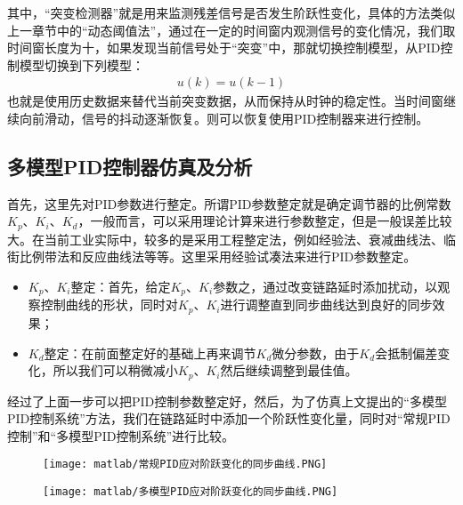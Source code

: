 其中，“突变检测器”就是用来监测残差信号是否发生阶跃性变化，具体的方法类似上一章节中的“动态阈值法”，通过在一定的时间窗内观测信号的变化情况，我们取时间窗长度为十，如果发现当前信号处于“突变”中，那就切换控制模型，从PID控制模型切换到下列模型：
\begin {align}
u(k) = u(k-1)
\end{align}
也就是使用历史数据来替代当前突变数据，从而保持从时钟的稳定性。当时间窗继续向前滑动，信号的抖动逐渐恢复。则可以恢复使用PID控制器来进行控制。

\subsection{多模型PID控制器仿真及分析}
首先，这里先对PID参数进行整定。所谓PID参数整定就是确定调节器的比例常数$K_{p}$、$K_{i}$、$K_{d}$，一般而言，可以采用理论计算来进行参数整定，但是一般误差比较大。在当前工业实际中，较多的是采用工程整定法，例如经验法、衰减曲线法、临街比例带法和反应曲线法等等。这里采用经验试凑法来进行PID参数整定。
\begin{itemize}[noitemsep,topsep=0pt,parsep=0pt,partopsep=0pt]
  \item $K_{p}$、$K_{i}$整定：首先，给定$K_{p}$、$K_{i}$参数之，通过改变链路延时添加扰动，以观察控制曲线的形状，同时对$K_{p}$、$K_{i}$进行调整直到同步曲线达到良好的同步效果；
  \item $K_{d}$整定：在前面整定好的基础上再来调节$K_{d}$微分参数，由于$K_{d}$会抵制偏差变化，所以我们可以稍微减小$K_{p}$、$K_{i}$然后继续调整到最佳值。
\end{itemize}

经过了上面一步可以把PID控制参数整定好，然后，为了仿真上文提出的“多模型PID控制系统”方法，我们在链路延时中添加一个阶跃性变化量，同时对“常规PID控制”和“多模型PID控制系统”进行比较。

\begin{figure}[htbp]
  \centering
  \begin{minipage}[b]{0.7\textwidth}
   \captionstyle{\centering}
   \centering
   \texttt{[image: matlab/常规PID应对阶跃变化的同步曲线.PNG]}
  \end{minipage}     
\end{figure}

\begin{figure}[htbp]
  \centering
  \begin{minipage}[b]{0.7\textwidth}
   \captionstyle{\centering}
   \centering
   \texttt{[image: matlab/多模型PID应对阶跃变化的同步曲线.PNG]}
  \end{minipage}     
\end{figure}

